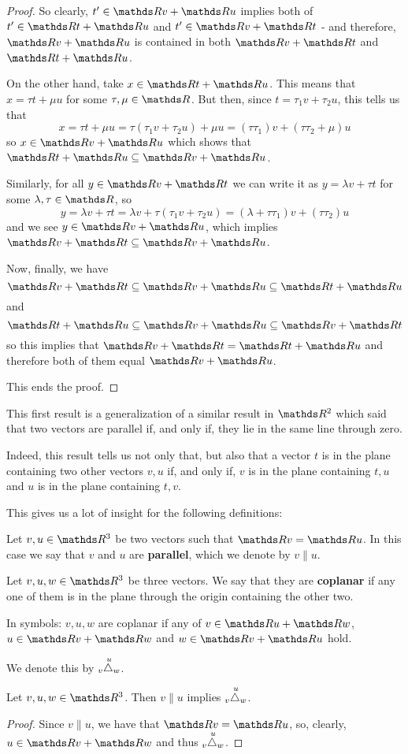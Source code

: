 \begin{proof}
	So clearly, $t'\in \R v+\R u$ implies both of $t'\in \R t+\R u$ and $t'\in \R v+\R t$ - and therefore, $\R v+\R u$ is contained in both $\R v+\R t$ and $\R t+ \R u$.
	
	\bigskip
	On the other hand, take $x\in \R t+\R u$. This means that $x=\tau t+\mu u$ for some $\tau,\mu\in \R$. But then, since $t=\tau_1v+\tau_2u$, this tells us that
	\[x=\tau t+\mu u=\tau(\tau_1v+\tau_2u)+\mu u=(\tau\tau_1)v+(\tau\tau_2+\mu)u\]so $x\in \R v+\R u$ which shows that $\R t+\R u\subseteq \R v+\R u$.
	
	Similarly, for all $y\in \R v+\R t$ we can write it as $y=\lambda v+\tau t$ for some $\lambda,\tau\in \R$, so
	\[y=\lambda v+\tau t=\lambda v+\tau(\tau_1v+\tau_2u)=(\lambda+\tau\tau_1)v+(\tau\tau_2)u\]and we see $y\in \R v+\R u$, which implies $\R v+\R t\subseteq \R v+\R u$.
	
	\bigskip
	Now, finally, we have $$\R v+\R t\subseteq\R v+\R u\subseteq \R t+\R u$$and
	\[\R t+\R u\subseteq\R v+\R u\subseteq\R v+\R t\]so this implies that $\R v+\R t=\R t+\R u$ and therefore both of them equal $\R v+\R u$.
	
	This ends the proof.
\end{proof}
\begin{rmk}
	This first result is a generalization of a similar result in $\R^2$ which said that two vectors are parallel if, and only if, they lie in the same line through zero.
	
	Indeed, this result tells us not only that, but also that a vector $t$ is in the plane containing two other vectors $v,u$ if, and only if, $v$ is in the plane containing $t,u$ and $u$ is in the plane containing $t,v$.
	
	This gives us a lot of insight for the following definitions:
\end{rmk}

\begin{df}
	Let $v,u\in \R^3$ be two vectors such that $\R v=\R u$. In this case we say that $v$ and $u$ are \textbf{parallel}, which we denote by $v\parallel u$.
\end{df}

\begin{df}
	Let $v,u,w\in\R^3$ be three vectors. We say that they are \textbf{coplanar} if any one of them is in the plane through the origin containing the other two.
	
	In symbols: $v,u,w$ are coplanar if any of $v\in \R u+\R w$, $u\in\R v+\R w$ and $w\in\R v+\R u$ hold.
	
	We denote this by $\plane{v}{u}{w}$.
\end{df}
\begin{lemma}
	Let $v,u,w\in \R^3$. Then $v\parallel u$ implies $\plane{v}{u}{w}$.
\end{lemma}
\begin{proof}
	Since $v\parallel u$, we have that $\R v=\R u$, so, clearly, $u\in \R v+\R w$ and thus $\plane{v}{u}{w}$.
\end{proof}

